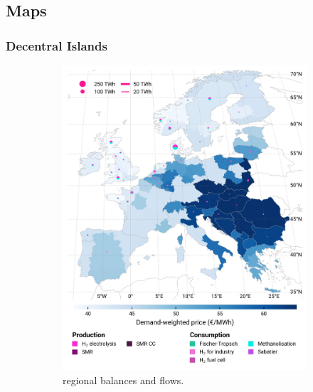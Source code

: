 \documentclass[preprint,12pt,sort&compress]{elsarticle}
\begin{document}
\clearpage
\subsection{Maps}
\label{sec:maps}
\subsubsection{Decentral Islands}
\begin{figure}[htbp]
  \centering
  \begin{subfigure}[t]{0.49\textwidth}
      \vspace{0pt}
      \includegraphics[width=1\textwidth]{maps/no-pipelines-no-pcipmi/base_s_adm___2030-balance_map_H2}
      \vspace{-0.5cm}
      \caption{ regional balances and flows.}
      \label{fig:DI_lt_2030_h2}
  \end{subfigure}
  \hfill
  \begin{subfigure}[t]{0.49\textwidth}
      \vspace{0pt}

\end{subfigure}
\end{figure}
\end{document}
